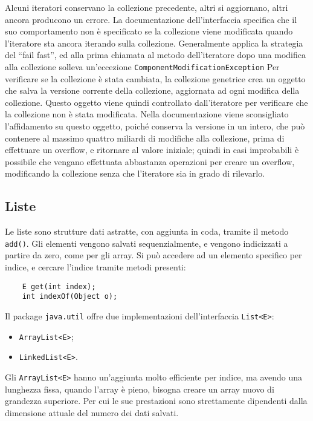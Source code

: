 \documentclass{article}
\numberwithin{equation}{subsection}
\begin{document}
Alcuni iteratori conservano la collezione precedente, altri si aggiornano, altri ancora producono un errore. 
La documentazione dell'interfaccia specifica che il suo comportamento non è specificato se la collezione viene modificata quando l'iteratore sta ancora iterando sulla collezione. 
Generalmente applica la strategia del ``fail fast'', ed alla prima chiamata al metodo dell'iteratore dopo una modifica alla collezione solleva un'eccezione \verb|ComponentModificationException|
Per verificare se la collezione è stata cambiata, la collezione genetrice crea un oggetto che salva la versione corrente della collezione, aggiornata ad ogni modifica 
della collezione. Questo oggetto viene quindi controllato dall'iteratore per verificare che la collezione non è stata modificata. 
Nella documentazione viene sconsigliato l'affidamento su questo oggetto, poiché conserva la versione in un intero, che può contenere al massimo quattro miliardi di modifiche 
alla collezione, prima di effettuare un overflow, e ritornare al valore iniziale; quindi in casi improbabili è possibile che vengano effettuata abbastanza operazioni per creare un overflow, 
modificando la collezione senza che l'iteratore sia in grado di rilevarlo. 

\subsection{Liste}

Le liste sono strutture dati astratte, con aggiunta in coda, tramite il metodo \verb|add()|. Gli elementi vengono salvati sequenzialmente, e vengono indicizzati a partire
da zero, come per gli array. Si può accedere ad un elemento specifico per indice, e cercare l'indice tramite metodi presenti:
\begin{verbatim}
    E get(int index);
    int indexOf(Object o);
\end{verbatim}

Il package \verb|java.util| offre due implementazioni dell'interfaccia \verb|List<E>|:
\begin{itemize}
    \item \verb|ArrayList<E>|;
    \item \verb|LinkedList<E>|.
\end{itemize}
Gli \verb|ArrayList<E>| hanno un'aggiunta molto efficiente per indice, ma avendo una lunghezza fissa, quando l'array è pieno, bisogna creare un array nuovo di grandezza 
superiore. 
Per cui le sue prestazioni sono strettamente dipendenti dalla dimensione attuale del numero dei dati salvati. 
\end{document}
